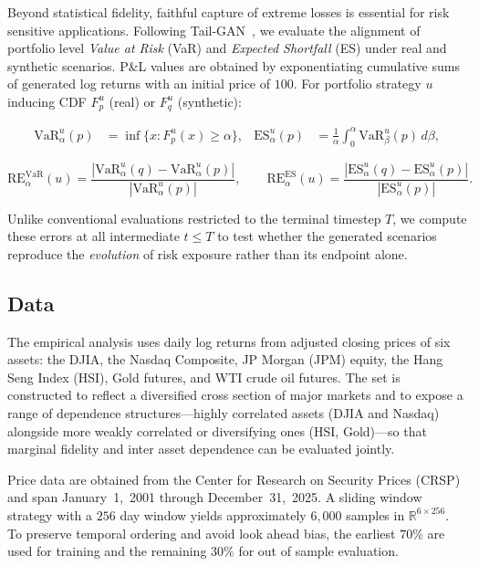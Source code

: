 \documentclass[sigconf,natbib=false]{acmart}
\begin{document}
Beyond statistical fidelity, faithful capture of extreme losses is essential for risk sensitive applications. Following Tail-GAN~\cite{Cont26}, we evaluate the alignment of portfolio level \emph{Value at Risk} (VaR) and \emph{Expected Shortfall} (ES) under real and synthetic scenarios. P\&L values are obtained by exponentiating cumulative sums of generated log returns with an initial price of $100$. For portfolio strategy $u$ inducing CDF $F_p^u$ (real) or $F_q^u$ (synthetic):
{\footnotesize
\begin{align}
    \mathrm{VaR}_\alpha^u(p) &= \inf\bigl\{ x : F_p^u(x) \ge \alpha \bigr\}, &
    \mathrm{ES}_\alpha^u(p) &= \tfrac{1}{\alpha}\!\int_0^\alpha \mathrm{VaR}_\beta^u(p)\,d\beta,
\end{align}

\begin{equation}
    \mathrm{RE}^{\mathrm{VaR}}_\alpha(u)
    =
    \frac{
    |\mathrm{VaR}_\alpha^u(q)-\mathrm{VaR}_\alpha^u(p)|
    }{
    |\mathrm{VaR}_\alpha^u(p)|
    },
    \qquad
    \mathrm{RE}^{\mathrm{ES}}_\alpha(u)
    =
    \frac{
    |\mathrm{ES}_\alpha^u(q)-\mathrm{ES}_\alpha^u(p)|
    }{
    |\mathrm{ES}_\alpha^u(p)|
    }.
\end{equation}
}
Unlike conventional evaluations restricted to the terminal timestep $T$, we compute these errors at all intermediate $t \le T$ to test whether the generated scenarios reproduce the \emph{evolution} of risk exposure rather than its endpoint alone.

\subsection{Data}

The empirical analysis uses daily log returns from adjusted closing prices of six assets: the DJIA, the Nasdaq Composite, JP Morgan (JPM) equity, the Hang Seng Index (HSI), Gold futures, and WTI crude oil futures. The set is constructed to reflect a diversified cross section of major markets and to expose a range of dependence structures---highly correlated assets (DJIA and Nasdaq) alongside more weakly correlated or diversifying ones (HSI, Gold)---so that marginal fidelity and inter asset dependence can be evaluated jointly.

Price data are obtained from the Center for Research on Security Prices (CRSP) and span January~1,~2001 through December~31,~2025. A sliding window strategy with a $256$ day window yields approximately $6{,}000$ samples in $\mathbb{R}^{6 \times 256}$. To preserve temporal ordering and avoid look ahead bias, the earliest $70\%$ are used for training and the remaining $30\%$ for out of sample evaluation.
\end{document}
